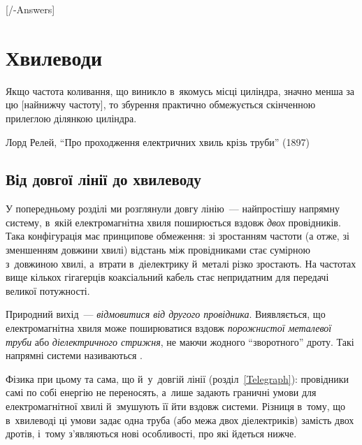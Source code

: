 
[\currfilebase/\currfilebase-Answers]
\chapter{Хвилеводи}\label{\currfilebase}\hypertarget{\currfilebase}{}
\graphicspath{{\currfilebase/Pictures}}
\epigraph{\Alexander Якщо частота коливання, що виникло в~якомусь місці циліндра, значно менша за цю [найнижчу
частоту], то збурення практично обмежується скінченною прилеглою ділянкою циліндра.}{Лорд Релей, \enquote{Про
проходження електричних хвиль крізь труби} (1897)}

\section{Від довгої лінії до хвилеводу}\hypertarget{from-line-to-waveguide}{}

У попередньому розділі ми розглянули довгу лінію~--- найпростішу напрямну систему, в~якій електромагнітна хвиля поширюється вздовж \emph{двох} провідників. Така конфігурація має принципове обмеження: зі зростанням частоти (а отже, зі зменшенням довжини хвилі) відстань між провідниками стає сумірною з~довжиною хвилі, а~втрати в~діелектрику й~металі різко зростають. На частотах вище кількох гігагерців коаксіальний кабель стає непридатним для передачі великої потужності.

Природний вихід~--- \emph{відмовитися від другого провідника}. Виявляється, що електромагнітна хвиля може поширюватися вздовж \emph{порожнистої металевої труби} або \emph{діелектричного стрижня}, не маючи жодного \enquote{зворотного} дроту. Такі напрямні системи називаються .

Фізика при цьому та сама, що й~у~довгій лінії (розділ~\ref{Telegraph}): провідники самі по собі енергію не переносять, а~лише задають граничні умови для електромагнітної хвилі й~змушують її йти вздовж системи. Різниця в~тому, що в~хвилеводі ці умови задає одна труба (або межа двох діелектриків) замість двох дротів, і~тому з'являються нові особливості, про які йдеться нижче.

